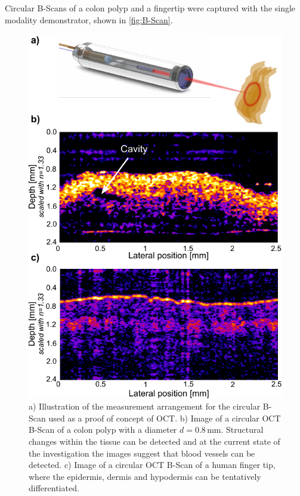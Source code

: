 \documentclass[10pt]{iopart}
\begin{document}
Circular B-Scans of a colon polyp and a fingertip were captured with the single modality demonstrator, shown in \autoref{fig:B-Scan}. 
\begin{figure}[h!]\centering \includegraphics[width=\columnwidth]{figures/OCT_Measurement_arrangement}
      \caption{a) Illustration of the measurement arrangement for the circular B-Scan used as a proof of concept of OCT. b) Image of a circular OCT B-Scan of a colon polyp with a diameter $d=0.8\,\text{mm}$. Structural changes within the tissue can be detected and at the current state of the investigation the images suggest that blood vessels can be detected.
      c) Image of a circular OCT B-Scan of a human finger tip, where the epidermis, dermis and hypodermis can be tentatively differentiated.}
      \label{fig:B-Scan}
\end{figure}
\end{document}
